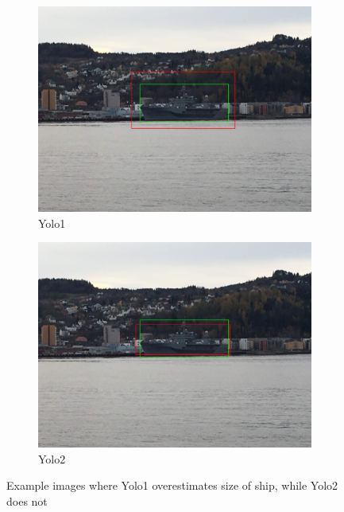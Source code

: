 \begin{figure}[h!]
\begin{subfigure}{.5\textwidth}
  \centering
  \includegraphics[width=0.75\linewidth]{results/case_tr_moor/yolo12/yolo1/big/IMG_2670.jpg}
  \caption{Yolo1}
\end{subfigure}%
\begin{subfigure}{.5\textwidth}
  \centering
  \includegraphics[width=.75\linewidth]{results/case_tr_moor/yolo12/yolo2/big/IMG_2670.jpg}
  \caption{Yolo2}
\end{subfigure}
\caption{Example images where Yolo1 overestimates size of ship, while Yolo2 does not}
\label{img:yolo1_big_box}
\end{figure}

\newpage
